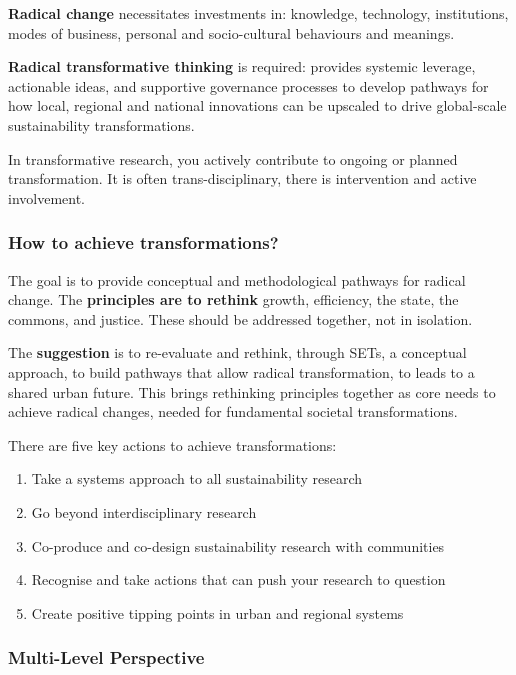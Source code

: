 \documentclass{article}
\begin{document}
\textbf{Radical change} necessitates investments in: knowledge, technology, institutions, modes of business, personal and socio-cultural behaviours and meanings.

\textbf{Radical transformative thinking} is required: provides systemic leverage, actionable ideas, and supportive governance processes to develop pathways for how local, regional and national innovations can be upscaled to drive global-scale sustainability transformations.

In transformative research, you actively contribute to ongoing or planned transformation. It is often trans-disciplinary, there is intervention and active involvement.

\subsubsection{How to achieve transformations?}

The goal is to provide conceptual and methodological pathways for radical change. 
The \textbf{principles are to rethink} growth, efficiency, the state, the commons, and justice. These should be addressed together, not in isolation.

The \textbf{suggestion} is to re-evaluate and rethink, through SETs, a conceptual approach, to build pathways that allow radical transformation, to leads to a shared urban future.
This brings rethinking principles together as core needs to achieve radical changes, needed for fundamental societal transformations.

There are five key actions to achieve transformations:

\begin{enumerate}
	\item Take a systems approach to all sustainability research
	\item Go beyond interdisciplinary research
	\item Co-produce and co-design sustainability research with communities
	\item Recognise and take actions that can push your research to question
	\item Create positive tipping points in urban and regional systems
\end{enumerate}

\subsubsection{Multi-Level Perspective}
\end{document}
